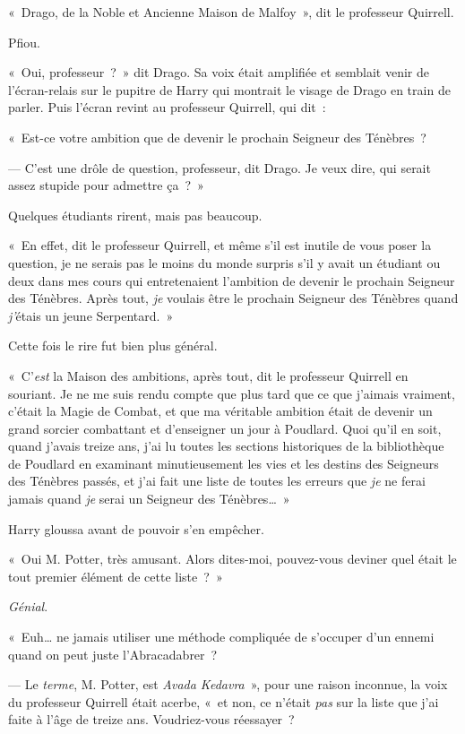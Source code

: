 «~Drago, de la Noble et Ancienne Maison de Malfoy~», dit le professeur Quirrell.

Pfiou.

«~Oui, professeur~?~» dit Drago. Sa voix était amplifiée et semblait venir de l'écran-relais sur le pupitre de Harry qui montrait le visage de Drago en train de parler. Puis l'écran revint au professeur Quirrell, qui dit~:

«~Est-ce votre ambition que de devenir le prochain Seigneur des Ténèbres~?

--- C'est une drôle de question, professeur, dit Drago. Je veux dire, qui serait assez stupide pour admettre ça~?~»

Quelques étudiants rirent, mais pas beaucoup.

«~En effet, dit le professeur Quirrell, et même s'il est inutile de vous poser la question, je ne serais pas le moins du monde surpris s'il y avait un étudiant ou deux dans mes cours qui entretenaient l'ambition de devenir le prochain Seigneur des Ténèbres. Après tout, \emph{je} voulais être le prochain Seigneur des Ténèbres quand \emph{j'}étais un jeune Serpentard.~»

Cette fois le rire fut bien plus général.

«~C'\emph{est} la Maison des ambitions, après tout, dit le professeur Quirrell en souriant. Je ne me suis rendu compte que plus tard que ce que j'aimais vraiment, c'était la Magie de Combat, et que ma véritable ambition était de devenir un grand sorcier combattant et d'enseigner un jour à Poudlard. Quoi qu'il en soit, quand j'avais treize ans, j'ai lu toutes les sections historiques de la bibliothèque de Poudlard en examinant minutieusement les vies et les destins des Seigneurs des Ténèbres passés, et j'ai fait une liste de toutes les erreurs que \emph{je} ne ferai jamais quand \emph{je} serai un Seigneur des Ténèbres…~»

Harry gloussa avant de pouvoir s'en empêcher.

«~Oui M. Potter, très amusant. Alors dites-moi, pouvez-vous deviner quel était le tout premier élément de cette liste~?~»

\emph{Génial}.

«~Euh… ne jamais utiliser une méthode compliquée de s'occuper d'un ennemi quand on peut juste l'Abracadabrer~?

--- Le \emph{terme}, M. Potter, est \emph{Avada Kedavra}~», pour une raison inconnue, la voix du professeur Quirrell était acerbe, «~et non, ce n'était \emph{pas} sur la liste que j'ai faite à l'âge de treize ans. Voudriez-vous réessayer~?

